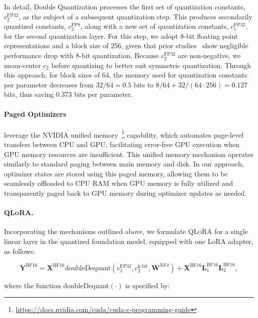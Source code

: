 In detail, Double Quantization processes the first set of quantization constants, $c_2^{\text{FP32}}$, as the subject of a subsequent quantization step. This produces secondarily quantized constants, $c_2^{\text{FP8}}$, along with a new set of quantization constants, $c_1^{\text{FP32}}$, for the second quantization layer. For this step, we adopt 8-bit floating point representations and a block size of 256, given that prior studies~\citep{dettmers2022case} show negligible performance drop with 8-bit quantization. Because $c_2^{\text{FP32}}$ are non-negative, we mean-center $c_2$ before quantizing to better suit symmetric quantization. Through this approach, for block sizes of 64, the memory used for quantization constants per parameter decreases from $32/64=0.5$ bits to $8/64 + 32/(64\cdot256) = 0.127$ bits, thus saving 0.373 bits per parameter.

\paragraph{Paged Optimizers} leverage the NVIDIA unified memory~\footnote{\tiny \url{https://docs.nvidia.com/cuda/cuda-c-programming-guide}} capability, which automates page-level transfers between CPU and GPU, facilitating error-free GPU execution when GPU memory resources are insufficient. This unified memory mechanism operates similarly to standard paging between main memory and disk. In our approach, optimizer states are stored using this paged memory, allowing them to be seamlessly offloaded to CPU RAM when GPU memory is fully utilized and transparently paged back to GPU memory during optimizer updates as needed.

\paragraph{\textsc{QLoRA}.} Incorporating the mechanisms outlined above, we formulate \textsc{QLoRA} for a single linear layer in the quantized foundation model, equipped with one LoRA adapter, as follows:

\begin{equation}
    \mathbf{Y}^{\text{BF16}} =  \mathbf{X}^{\text{BF16}} \text{doubleDequant}(c_1^{\text{FP32}}, c_2^{\text{k-bit}}, \mathbf{W}^{\text{NF4}}) + \mathbf{X}^{\text{BF16}}\mathbf{L}^{\text{BF16}}_1\mathbf{L}^{\text{BF16}}_2,
\end{equation}

where the function doubleDequant$(\cdot)$ is specified by:

